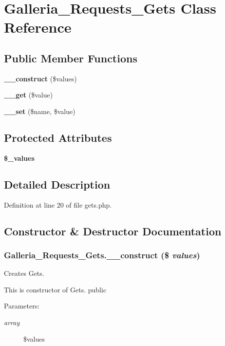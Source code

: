 \section{Galleria\_\-Requests\_\-Gets Class Reference}
\label{classGalleria__Requests__Gets}
\subsection*{Public Member Functions}
\begin{CompactItemize}
\item 
{\bf \_\-\_\-construct} (\$values)
\item 
{\bf \_\-\_\-get} (\$value)
\item 
{\bf \_\-\_\-set} (\$name, \$value)
\end{CompactItemize}
\subsection*{Protected Attributes}
\begin{CompactItemize}
\item 
{\bf \$\_\-values}
\end{CompactItemize}


\subsection{Detailed Description}


Definition at line 20 of file gets.php.

\subsection{Constructor \& Destructor Documentation}
\subsubsection{\setlength{\rightskip}{0pt plus 5cm}Galleria\_\-Requests\_\-Gets.\_\-\_\-construct (\$ {\em values})}\label{classGalleria__Requests__Gets_554871083aa2650b50f2421347758c83}


Creates Gets.

This is constructor of Gets.  public \begin{Desc}
\item[Parameters:]
\begin{description}
\item[{\em array}]\$values \end{description}
\end{Desc}


